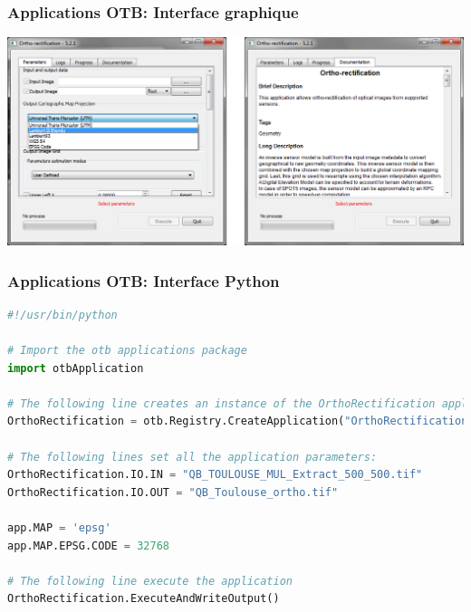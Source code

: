 \documentclass[8pt]{beamer}
\begin{document}
\begin{frame}[fragile]
\frametitle{Applications OTB: Interface graphique}
\begin{center}
\includegraphics[width=1\textwidth]{../OTB-General/images/otbgui.png}
\end{center}
\end{frame}

\begin{frame}[fragile]
\frametitle{Applications OTB: Interface Python}
\begin{lstlisting}[language=python,breaklines=true,breakatwhitespace=true,frame = tb,framerule = 0.25pt,fontadjust,backgroundcolor={\color{listlightgray}},basicstyle = {\ttfamily\tiny},keywordstyle = {\ttfamily\color{listkeyword}\textbf},identifierstyle = {\ttfamily},commentstyle = {\ttfamily\color{listcomment}\textit},stringstyle = {\ttfamily},showstringspaces = false,showtabs = false,numbers = none,numbersep = 6pt, numberstyle={\ttfamily\color{listnumbers}},tabsize = 2]
#!/usr/bin/python

# Import the otb applications package
import otbApplication

# The following line creates an instance of the OrthoRectification application
OrthoRectification = otb.Registry.CreateApplication("OrthoRectification")

# The following lines set all the application parameters:
OrthoRectification.IO.IN = "QB_TOULOUSE_MUL_Extract_500_500.tif"
OrthoRectification.IO.OUT = "QB_Toulouse_ortho.tif"

app.MAP = 'epsg'
app.MAP.EPSG.CODE = 32768

# The following line execute the application
OrthoRectification.ExecuteAndWriteOutput()
\end{lstlisting}
\end{frame}
\end{document}
